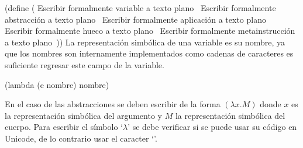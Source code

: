 \documentclass[letterpaper, twoside, openright, 11pt]{book}%
\begin{document}
\nwenddocs{}\endmoddef\nwstartdeflinemarkup{}\nwenddeflinemarkup
(define 
  (
   \LA{}Escribir formalmente variable a texto plano~{\nwtagstyle{}}\RA{}
   \LA{}Escribir formalmente abstracción a texto plano~{\nwtagstyle{}}\RA{}
   \LA{}Escribir formalmente aplicación a texto plano~{\nwtagstyle{}}\RA{}
   \LA{}Escribir formalmente hueco a texto plano~{\nwtagstyle{}}\RA{}
   \LA{}Escribir formalmente metainstrucción a texto plano~{\nwtagstyle{}}\RA{}))
\eatline
{}\nwendcode{}\nwdocspar
La representación simbólica de una variable es su nombre, ya que los nombres son internamente implementados como cadenas de caracteres es suficiente regresar este campo de la variable.

\nwenddocs{}\endmoddef\nwstartdeflinemarkup{}\nwenddeflinemarkup
(lambda (e nombre) nombre)
\nwendcode{}\nwdocspar

En el caso de las abstracciones se deben escribir de la forma \( (λx.M) \) donde \( x \) es la representación simbólica del argumento y \( M \) la representación simbólica del cuerpo. Para escribir el símbolo `\( λ \)' se debe verificar si se puede usar su código en {\Tt{}Unicode\nwendquote}, de lo contrario usar el caracter `{\Tt{}{\nwbackslash}\nwendquote}'.
\end{document}

